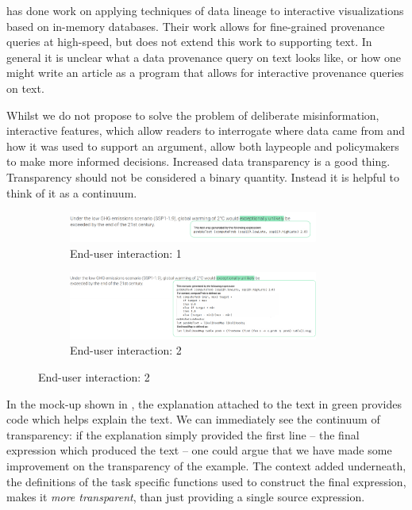 \cite{psallidas18} has done work on applying techniques of data lineage to interactive
visualizations based on in-memory databases. Their work allows for fine-grained
provenance queries at high-speed, but does not extend this work to supporting text.
In general it is unclear what a data provenance query on text looks like, or how one
might write an article as a program that allows for interactive provenance queries on text.

Whilst we do not propose to solve the problem of deliberate misinformation,
interactive features, which allow readers to interrogate where data came from and how
it was used to support an argument, allow both laypeople and policymakers to make more
informed decisions. Increased data transparency is a good thing. Transparency
should not be considered a binary quantity. Instead it is helpful to think of it as a continuum.

\begin{figure}
   \begin{subfigure}{\textwidth}
      \includegraphics[width=0.9\textwidth]{fig/ipcc-table-mockup-small.png}
      \caption{End-user interaction: 1}
      \label{fig:table-mockup-a}
   \end{subfigure}
   \begin{subfigure}{\textwidth}
      \includegraphics[width=0.9\textwidth]{fig/table-spm-fluid-mockup.png}
      \caption{End-user interaction: 2}
      \label{fig:table-mockup-b}
   \end{subfigure}
\end{figure}

In the mock-up shown in , the explanation attached to the text in
green provides code which helps explain the text. We can immediately see the continuum of
transparency: if the explanation simply provided the first line -- the final expression which
produced the text -- one could argue that we have made some improvement on the transparency
of the example. The context added underneath, the definitions of the task specific functions
used to construct the final expression, makes it \emph{more transparent}, than just 
providing a single source expression.


